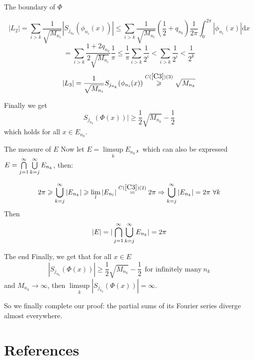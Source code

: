 \documentclass{beamer}
\begin{document}
\begin{frame}{The boundary of $ \Phi $}
    \begin{block}{}
        \[ |L_2|= \sum_{i>k}\frac{1}{\sqrt{M_{n_i}}}|S_{j_{n_k}}(\phi_{n_i}(x))|\leqslant \sum_{i>k}\frac{1}{\sqrt{M_{n_i}}}(\frac{1}{2}+q_{n_k})\frac{1}{2\pi}\int_{0}^{2\pi}|\phi_{n_i}(x)|\mathrm{d}x\]
\[ = \sum_{i>k}\frac{1+2q_{n_k}}{2\sqrt{M_{n_i}}}\frac{1}{\pi}\leqslant \frac{1}{\pi}\sum_{i>k}\frac{1}{2^i}<\sum_{i>k}\frac{1}{2^i}<\frac{1}{2^k}\]
\[ |L_3|= \frac{1}{\sqrt{M_{n_i}}}S_{j_{n_k}}(\phi_{n_i}(x)) \overset{C(\ref{C3})(3)}{\geqslant } \sqrt{M_{n_k}} \]

    \end{block}
    Finally we get
    \[ S_{j_{n_k}}(\Phi(x))|\geqslant \frac{1}{2}\sqrt{M_{n_k}}-\frac{1}{2} \]
    which holds for all $ x\in E_{n_k} $.\par
\end{frame}
\begin{frame}{The measure of $ E $}
    Now let $ E= \limsup\limits_{k} E_{n_k}  $，which can also be expressed $ E=\bigcap\limits_{j=1}^{\infty} \bigcup\limits\limits_{k=j}^{\infty}  E_{n_k} $, then:

\[ 2\pi \geqslant \bigcup\limits\limits_{k=j}^{\infty}  |E_{n_k}|  \geqslant \lim\limits_l|E_{n_l}| \overset{C(\ref{C3})(2)}{=} 2\pi \Rightarrow \bigcup\limits\limits_{k=j}^{\infty} | E_{n_k}|=2\pi \ \forall k\]
Then 
\[ |E| = |\bigcap\limits_{j=1}^{\infty} \bigcup\limits\limits_{k=j}^{\infty}  E_{n_k}|=2\pi\]
\end{frame}
\begin{frame}{The end}
    Finally, we get that for all $ x \in E $ 
\[  |S_{j_{n_k}}(\Phi(x))| \geqslant\frac{1}{2}\sqrt{M_{n_k}}-\frac{1}{2}\ \  \text{for infinitely many}\ n_k  \] 
and $ M_{n_k} \rightarrow \infty $, then $ \limsup\limits_k |S_{j_{n_k}}(\Phi(x))| = \infty$.\par
So we finally complete our proof: the partial sums of its Fourier series diverge almost everywhere.

\end{frame}




\section{References}
\end{document}
